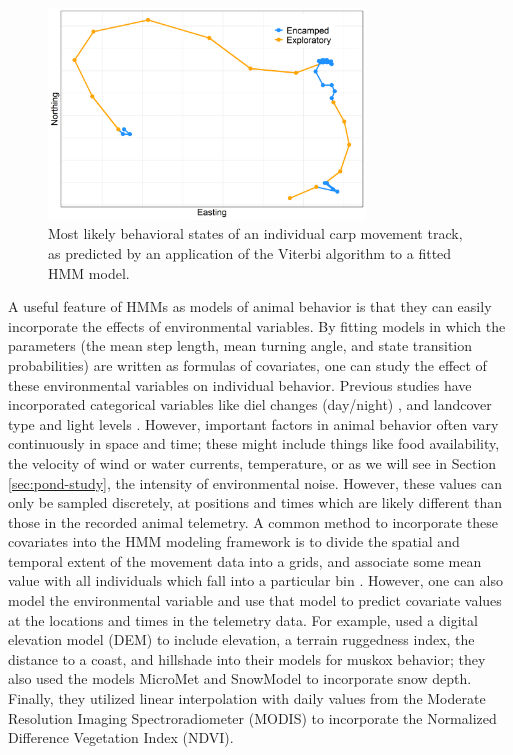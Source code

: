 \documentclass[12pt]{article}
\begin{document}
	\begin{figure}
		\centering
		\includegraphics[width=0.75\textwidth]{track_states.png}
		\caption{Most likely behavioral states of an individual carp movement track, as predicted by an application of the Viterbi algorithm to a fitted HMM model.}
		\label{img:track_states}
	\end{figure}
	
	A useful feature of HMMs as models of animal behavior is that they can easily incorporate the effects of environmental variables. By fitting models in which the parameters (the mean step length, mean turning angle, and state transition probabilities) are written as formulas of covariates, one can study the effect of these environmental variables on individual behavior. Previous studies have incorporated categorical variables like diel changes (day/night) \cite{Bacheler2019}, and landcover type and light levels \cite{Beumer2020}. However, important factors in animal behavior often vary continuously in space and time; these might include things like food availability, the velocity of wind or water currents, temperature, or as we will see in Section \ref{sec:pond-study}, the intensity of environmental noise. However, these values can only be sampled discretely, at positions and times which are likely different than those in the recorded animal telemetry. A common method to incorporate these covariates into the HMM modeling framework is to divide the spatial and temporal extent of the movement data into a grids, and associate some mean value with all individuals which fall into a particular bin \cite{Patterson2018, Pederson2011, Griffiths2018}. However, one can also model the environmental variable and use that model to predict covariate values at the locations and times in the telemetry data. For example, \cite{Beumer2020} used a digital elevation model (DEM) to include elevation, a terrain ruggedness index, the distance to a coast, and hillshade into their models for muskox behavior; they also used the models MicroMet and SnowModel to incorporate snow depth. Finally, they utilized linear interpolation with daily values from the Moderate Resolution Imaging Spectroradiometer (MODIS) to incorporate the Normalized Difference Vegetation Index (NDVI).
	
\end{document}
